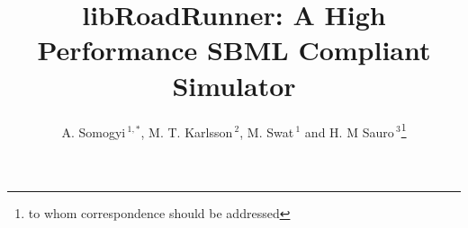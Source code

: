 \documentclass{bioinfo}
\begin{document}

\title[libRoadRunner]{libRoadRunner: A High Performance SBML Compliant Simulator}
\author[Sample \textit{et~al}]{A. Somogyi\,$^{1,*}$, M. T. Karlsson\,$^{2}$, M. Swat\,$^{1}$ and H. M Sauro\,$^3$\footnote{to whom correspondence should be addressed}}
\address{$^{1,3}$Biocomplexity Institute, Indiana University, Simon Hall MSB1, 212 S. Hawthorne Drive, Bloomington, IN  47405-7003
\\
$^{2}$Dune Scientific, 10522 Lake City Way NE, \#302 Seattle WA \\
$^{3}$Department of Bioengineering, University of Washington, Seattle, WA, 98195}



\maketitle
\end{document}
